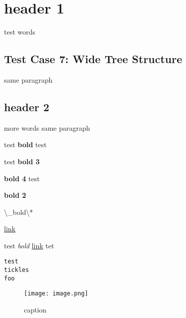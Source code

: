 \documentclass{article}
\begin{document}
\section{header 1}
test words

\subsection{Test Case 7: Wide Tree Structure}
same paragraph
\subsection{header 2}
more words same paragraph

test \textbf{bold} test

test \textbf{bold 3}

\textbf{bold 4} test

\textbf{bold 2}

\textbackslash{}_bold\textbackslash{}*

\href{www.test.com}{link}

test \emph{bold} \href{e.com}{link} tet


\begin{verbatim}
test
tickles
foo
\end{verbatim}
\begin{figure}[h]\centering\texttt{[image: image.png]}\caption{caption}\end{figure}
\end{document}
